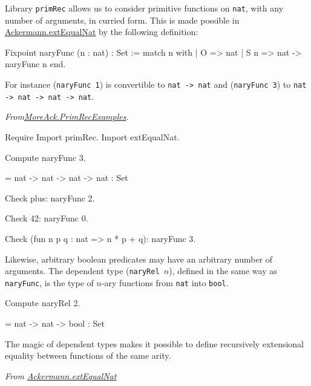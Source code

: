 Library \texttt{primRec} allows us to consider primitive functions on \texttt{nat}, with any number of arguments, in 
curried form. This is made possible in 
\href{../theories/html/hydras.Ackermann.extEqualNat.html}{Ackermann.extEqualNat} by the following definition:

\begin{Coqsrc}
Fixpoint naryFunc (n : nat) : Set :=
  match n with
  | O => nat
  | S n => nat -> naryFunc n
  end.
\end{Coqsrc}

For instance (\texttt{naryFunc 1}) is convertible to \texttt{nat -> nat} and (\texttt{naryFunc 3})
to \texttt{nat -> nat -> nat -> nat}.

\vspace{4pt}
\noindent
\emph{From\href{../theories/html/hydras.MoreAck.PrimRecExamples.html}{MoreAck.PrimRecExamples}}.
\begin{Coqsrc}
Require Import primRec.
Import extEqualNat.

Compute naryFunc 3.
\end{Coqsrc}

\begin{Coqanswer}
= nat -> nat -> nat -> nat
  : Set  
\end{Coqanswer}

\begin{Coqsrc}
Check plus: naryFunc 2.

Check 42: naryFunc 0.

Check (fun n p q : nat =>  n * p + q): naryFunc 3.
\end{Coqsrc}


Likewise, arbitrary boolean predicates may have an arbitrary number of arguments. The dependent type
(\texttt{naryRel $n$}), defined in the same way as \texttt{naryFunc}, is the type of $n$-ary functions from
\texttt{nat} into \texttt{bool}.

\begin{Coqsrc}
Compute naryRel 2.
\end{Coqsrc}

\begin{Coqanswer}
 = nat -> nat -> bool
     : Set
\end{Coqanswer}

The magic of dependent types makes it possible to define recursively extensional equality between functions of the same arity.

\vspace{4pt}
\noindent
\emph{From \href{../theories/html/hydras.Ackermann.extEqualNat.html}{Ackermann.extEqualNat}}

